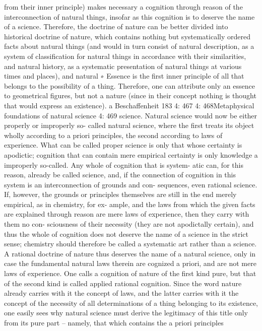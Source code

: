 from their inner principle) makes necessary a cognition through reason
of the interconnection of natural things, insofar as this cognition is to
deserve the name of a science. Therefore, the doctrine of nature can be
better divided into historical doctrine of nature, which contains nothing
but systematically ordered facts about natural things (and would in turn
consist of natural description, as a system of classiﬁcation for natural things
in accordance with their similarities, and natural history, as a systematic
presentation of natural things at various times and places), and natural
∗ Essence is the ﬁrst inner principle of all that belongs to the possibility of a
thing. Therefore, one can attribute only an essence to geometrical ﬁgures, but
not a nature (since in their concept nothing is thought that would express an
existence).
a Beschaffenheit
183
4: 467
4: 468Metaphysical foundations of natural science
4: 469
science. Natural science would now be either properly or improperly so-
called natural science, where the ﬁrst treats its object wholly according
to a priori principles, the second according to laws of experience.
What can be called proper science is only that whose certainty is
apodictic; cognition that can contain mere empirical certainty is only
knowledge a improperly so-called. Any whole of cognition that is system-
atic can, for this reason, already be called science, and, if the connection
of cognition in this system is an interconnection of grounds and con-
sequences, even rational science. If, however, the grounds or principles
themselves are still in the end merely empirical, as in chemistry, for ex-
ample, and the laws from which the given facts are explained through
reason are mere laws of experience, then they carry with them no con-
sciousness of their necessity (they are not apodictally certain), and thus
the whole of cognition does not deserve the name of a science in the
strict sense; chemistry should therefore be called a systematic art rather
than a science.
A rational doctrine of nature thus deserves the name of a natural
science, only in case the fundamental natural laws therein are cognized
a priori, and are not mere laws of experience. One calls a cognition
of nature of the ﬁrst kind pure, but that of the second kind is called
applied rational cognition. Since the word nature already carries with
it the concept of laws, and the latter carries with it the concept of the
necessity of all determinations of a thing belonging to its existence, one
easily sees why natural science must derive the legitimacy of this title only
from its pure part – namely, that which contains the a priori principles

